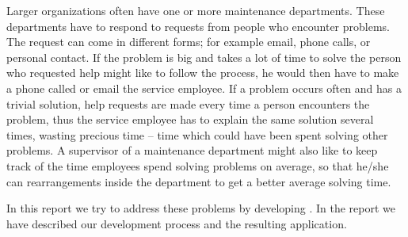 Larger organizations often have one or more maintenance departments.
These departments have to respond to requests from people who encounter problems. 
The request can come in different forms; for example email, phone calls, or personal contact. 
If the problem is big and takes a lot of time to solve the person who requested help might like to follow the process, he would then have to make a phone called or email the service employee. 
If a problem occurs often and has a trivial solution, help requests are made every time a person encounters the problem, thus the service employee has to explain the same solution several times, wasting precious time -- time which could have been spent solving other problems.
A supervisor of a maintenance department might also like to keep track of the time employees spend solving problems on average, so that he/she can rearrangements inside the department to get a better average solving time.

In this report we try to address these problems by developing \hdesk[]. In the report we have described our development process and the resulting application.